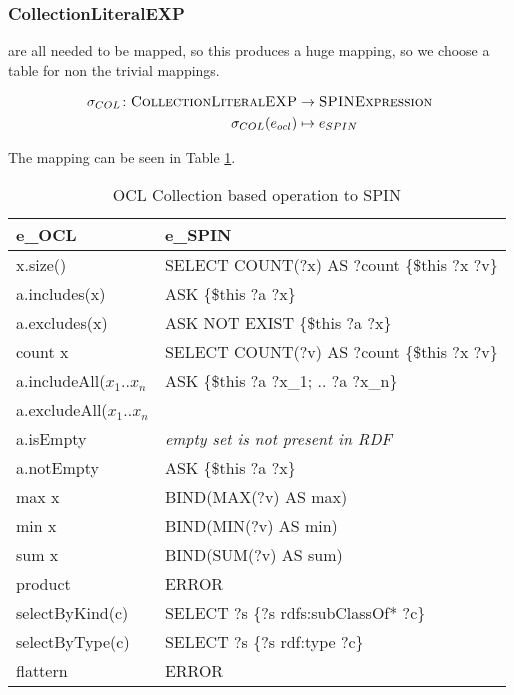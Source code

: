 \documentclass[runningheads]{llncs}
\begin{document}
\subsubsection{CollectionLiteralEXP}
are all needed to be mapped, so this produces a huge mapping, so we choose a table for non the trivial mappings.
\begin{definition}
    \begin{align*}
        \sigma_{COL}\colon\textsc{CollectionLiteralEXP} & \to\textsc{SPINExpression} \\
        \sigma_{COL}(e_{ocl})                           & \mapsto e_{SPIN}
    \end{align*}
\end{definition}
The mapping can be seen in Table \ref{OCLCollectionSPIN}.
\begin{table}[h]
    \centering
    \begin{tabular}{|l|l|}
        \hline
        \textbf{e_{OCL}}            & \textbf{e_{SPIN}}                           \\\hline
        x.size()                    & SELECT COUNT(?x) AS ?count \{\$this ?x ?v\} \\
        a.includes(x)               & ASK \{\$this ?a ?x\}                        \\
        a.excludes(x)               & ASK NOT EXIST \{\$this ?a ?x\}              \\
        count x                     & SELECT COUNT(?v) AS ?count \{\$this ?x ?v\} \\
        a.includeAll(\(x_1 .. x_n\) & ASK \{\$this ?a ?x_1; .. ?a ?x_n\}          \\
        a.excludeAll(\(x_1 .. x_n\) &                                             \\
        a.isEmpty                   & \textit{empty set is not present in RDF}    \\
        a.notEmpty                  & ASK \{\$this ?a ?x\}                        \\
        max x                       & BIND(MAX(?v) AS max)                        \\
        min x                       & BIND(MIN(?v) AS min)                        \\
        sum x                       & BIND(SUM(?v) AS sum)                        \\
        product                     & ERROR                                       \\
        selectByKind(c)             & SELECT ?s \{?s rdfs:subClassOf* ?c\}        \\
        selectByType(c)             & SELECT ?s \{?s rdf:type ?c\}                \\
        flattern                    & ERROR                                       \\\hline
    \end{tabular}
    \caption{OCL Collection based operation to SPIN}
    \label{OCLCollectionSPIN}
\end{table}
\end{document}
